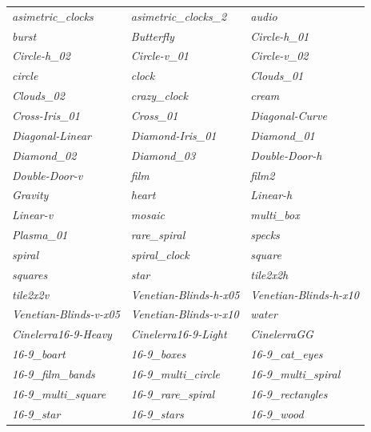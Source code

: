 	\begin{longtable}{p{4cm}p{4cm}p{4cm}}
		\label{tabular:transitions}\\
		\hline
		\textit{asimetric\_clocks} & \textit{asimetric\_clocks\_2} & \textit{audio} \\
		\textit{burst} & \textit{Butterfly} & \textit{Circle-h\_01} \\
		\textit{Circle-h\_02} & \textit{Circle-v\_01} & \textit{Circle-v\_02} \\
		\textit{circle} & \textit{clock} & \textit{Clouds\_01} \\
		\textit{Clouds\_02} & \textit{crazy\_clock} & \textit{cream} \\
		\textit{Cross-Iris\_01} & \textit{Cross\_01} & \textit{Diagonal-Curve} \\
		\textit{Diagonal-Linear} & \textit{Diamond-Iris\_01} & \textit{Diamond\_01} \\
		\textit{Diamond\_02} & \textit{Diamond\_03} & \textit{Double-Door-h} \\
		\textit{Double-Door-v} & \textit{film} & \textit{film2} \\
		\textit{Gravity} & \textit{heart} & \textit{Linear-h} \\
		\textit{Linear-v} & \textit{mosaic} & \textit{multi\_box} \\
		\textit{Plasma\_01} & \textit{rare\_spiral} & \textit{specks} \\
		\textit{spiral} & \textit{spiral\_clock} & \textit{square} \\
		\textit{squares} & \textit{star} & \textit{tile2x2h} \\
		\textit{tile2x2v} & \textit{Venetian-Blinds-h-x05} & \textit{Venetian-Blinds-h-x10} \\
		\textit{Venetian-Blinds-v-x05} & \textit{Venetian-Blinds-v-x10} & \textit{water} \\
        \hline
         \textit{Cinelerra16-9-Heavy} & \textit{Cinelerra16-9-Light} & \textit{CinelerraGG} \\
         \textit{16-9\_boart} & \textit{16-9\_boxes} & \textit{16-9\_cat\_eyes} \\
         \textit{16-9\_film\_bands} & \textit{16-9\_multi\_circle} & \textit{16-9\_multi\_spiral} \\
         \textit{16-9\_multi\_square} & \textit{16-9\_rare\_spiral} & \textit{16-9\_rectangles} \\
         \textit{16-9\_star} & \textit{16-9\_stars} & \textit{16-9\_wood} \\
		\hline
	\end{longtable}


